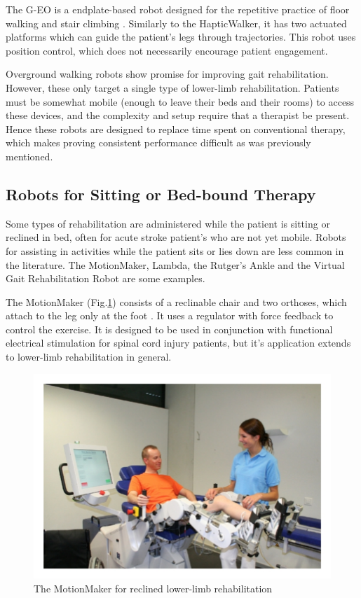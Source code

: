 \documentclass[12pt]{report}
\begin{document}
	The G-EO is a endplate-based robot designed for the repetitive practice of floor walking and stair climbing \cite{Hesse2010}. Similarly to the HapticWalker, it has two actuated platforms which can guide the patient's legs through trajectories. This robot uses position control, which does not necessarily encourage patient engagement. 
	
	
	Overground walking robots show promise for improving gait rehabilitation. However, these only target a single type of lower-limb rehabilitation. Patients must be somewhat mobile (enough to leave their beds and their rooms) to access these devices, and the complexity and setup require that a therapist be present. Hence these robots are designed to replace time spent on conventional therapy, which makes proving consistent performance difficult as was previously mentioned. 
	
	\subsection{Robots for Sitting or Bed-bound Therapy}
	
	Some types of rehabilitation are administered while the patient is sitting or reclined in bed, often for acute stroke patient's who are not yet mobile. Robots for assisting in activities while the patient sits or lies down are less common in the literature. The MotionMaker, Lambda, the Rutger's Ankle and the Virtual Gait Rehabilitation Robot are some examples. 
	
	The MotionMaker (Fig.\ref{fig:Motionmaker}) consists of a reclinable chair and two orthoses, which attach to the leg only at the foot \cite{Schmitt2004}. It uses a regulator with force feedback to control the exercise. It is designed to be used in conjunction with functional electrical stimulation for spinal cord injury patients, but it's application extends to lower-limb rehabilitation in general. 
	
	\begin{figure}[h] 
		\centering
		\includegraphics[width=0.75\linewidth]{Motionmaker}
		\caption{The MotionMaker for reclined lower-limb rehabilitation}
		\label{fig:Motionmaker}
	\end{figure}
	
\end{document}
